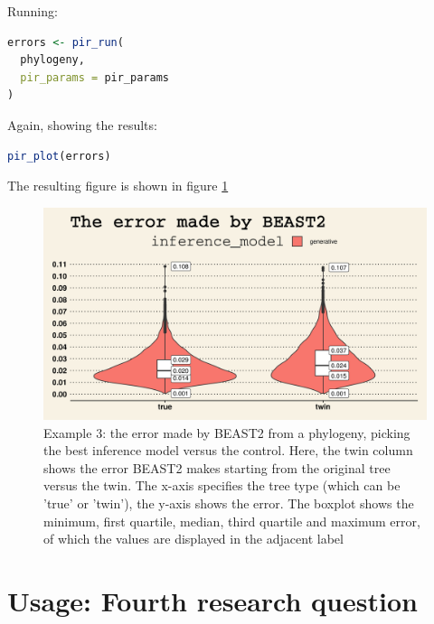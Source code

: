 \documentclass{article}
\begin{document}
Running:

\begin{lstlisting}[language=R, floatplacement=H, frame=single]
errors <- pir_run(
  phylogeny,
  pir_params = pir_params
)
\end{lstlisting}

Again, showing the results:

\begin{lstlisting}[language=R, floatplacement=H, frame=single]
pir_plot(errors)
\end{lstlisting}

The resulting figure is shown in figure \ref{fig:example_3}

\begin{figure}[h]
  \includegraphics[width=\textwidth]{figure_example_3.png}
  \caption{
    Example 3: the error made by BEAST2 from a phylogeny, picking the best inference model versus the control.
    Here, the twin column shows the error BEAST2 makes starting from the original tree versus the twin. 
    The x-axis specifies the tree type (which can be 'true' or 'twin'), the y-axis shows the error.
    The boxplot shows the minimum, first quartile, median, third 
    quartile and maximum error, of which the values are displayed 
    in the adjacent label
  }
  \label{fig:example_3}
\end{figure}

\section{Usage: Fourth research question}
\end{document}
